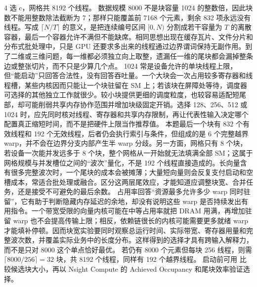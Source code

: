\begin{solutionexercise}{4}
\conclusionheading 选 c，网格共 8192 个线程。
\discussionheading
{}
数据规模 8000 不是块容量 1024 的整数倍，因此块数不能用整数除法截断为 7；那样只能覆盖前 7168 个元素，剩余 832 项永远没有线程。写成 $\lceil N/T\rceil$ 的意义，是把连续编号区间 $[0,N)$ 分割成若干容量为 $T$ 的离散容器，最后一个容器允许不满但不能缺席。相同思想出现在缓存瓦片、文件分片和分布式批处理中，只是 GPU 还要求多出来的线程通过边界谓词保持无副作用。到了二维或三维问题，每一维都必须独立向上取整，遗漏任一维的尾块都会漏掉整条边或整张切片，而不只是少算几个点。
1024 常是设备允许的单块线程上限，但“能启动”只回答合法性，没有回答吞吐量。一个大块会一次占用较多寄存器和线程槽，某些内核因而只能让一个块驻留在 SM 上；若该块在屏障处等待，调度器可选择的其他独立工作就很少。较小块提供更细的调度粒度，也较容易适配短尾部，却可能削弱共享内存协作范围并增加块级固定开销。选择 128、256、512 或 1024 时，应先同时核对线程、寄存器和共享内存限制，再让代表性输入决定哪个配置真正缩短时间，而不是把硬件上限当作推荐值。
本题最后一个块有 832 个有效线程和 192 个无效线程，后者仍会执行索引与条件，但组成的是 6 个完整越界 warp，并不会在边界分支内部产生半 warp 分歧。另一方面，网格只有 8 个块，若设备一次能并发远多于 8 个块，整个网格从一开始就无法填满全部 SM；这属于网格规模与并发槽位之间的“波次”量化，不是 192 个线程直接造成的。长向量含有很多完整波次时，一个尾块的成本会被摊薄；大量短向量则会反复支付启动和空槽成本，常适合批处理或融合。区分这两层尾效应，才能知道应调整块宽、合并任务，还是接受不可避免的最后余数。
占用率回答“资源最多允许多少 warp 同时驻留”，它有助于判断隐藏内存延迟的余地，却没有说明这些 warp 是否持续发出有用指令。一个带宽受限的向量内核可能在中等占用率就把 DRAM 用满，再增加驻留 warp 也不会提高传输上限；相反，依赖链很长的内核可能需要更多就绪 warp 才能填补停顿。因而块宽实验要同时观察总运行时间、实际带宽、寄存器用量和完整波次数，并覆盖实际业务中的长度分布。这样得到的选择才具有跨输入解释力，而不是只对 8000 这个单点恰好最优。
\variantheading 若仍有 8000 个元素但每块 256 线程，则需 $\lceil8000/256\rceil=32$ 块，共 8192 个线程，同样有 192 个越界线程。
\practiceheading 启动前可用  比较候选块大小，再以 Nsight Compute 的 Achieved Occupancy 和尾块效率验证选择。
\end{solutionexercise}

